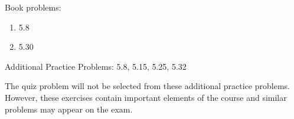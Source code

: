 
Book problems:
\begin{enumerate}
  \item 5.8
  \item 5.30
\end{enumerate}

Additional Practice Problems: 5.8, 5.15, 5.25, 5.32

\noindent The quiz problem will not be selected from these additional practice problems.  However, these exercises contain important elements of the course and similar problems may appear on the exam.

\iftoggle{flagSoln}{%
\vspace{.5cm}
\rule{\textwidth}{.4pt}
\vspace{.5cm}
\textbf{Solution:}
\begin{enumerate}
  \item[5.8] $\bar{X} = 1.653 in$, $\bar{Y} = 17.46 in$
	\item[5.30] 120.0 mm
\end{enumerate}
}{%
}%
